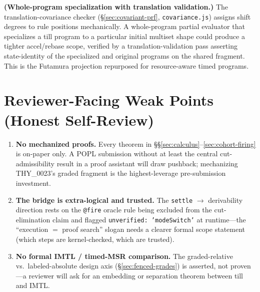 \documentclass[11pt]{article}
\theoremstyle{remark}
\begin{document}
\textbf{(Whole-program specialization with translation validation.)} The
translation-covariance checker (\S\ref{sec:covariant-prf}, \texttt{covariance.js})
assigns shift degrees to rule positions mechanically.  A whole-program partial
evaluator that specializes a till program to a particular initial multiset shape
could produce a tighter accel/rebase scope, verified by a translation-validation
pass asserting state-identity of the specialized and original programs on the
shared fragment.  This is the Futamura projection repurposed for resource-aware
timed programs.




\appendix
\section{Reviewer-Facing Weak Points (Honest Self-Review)}
\label{app:weak-points}

\begin{enumerate}
\item \textbf{No mechanized proofs.} Every theorem in
  \S\S\ref{sec:calculus}--\ref{sec:cohort-firing} is on-paper only.  A POPL
  submission without at least the central cut-admissibility result in a proof
  assistant will draw pushback; mechanizing THY\_0023's graded fragment is the
  highest-leverage pre-submission investment.

\item \textbf{The bridge is extra-logical and trusted.} The \texttt{settle} $\to$
  derivability direction rests on the \texttt{@fire} oracle rule being excluded
  from the cut-elimination claim and flagged \texttt{unverified: 'modeSwitch'} at
  runtime---the ``execution $=$ proof search'' slogan needs a clearer formal scope
  statement (which steps are kernel-checked, which are trusted).

\item \textbf{No formal IMTL / timed-MSR comparison.} The graded-relative
  vs.\ labeled-absolute design axis (\S\ref{sec:fenced-grades}) is asserted, not
  proven---a reviewer will ask for an embedding or separation theorem between till
  and IMTL.
\end{enumerate}
\end{document}
